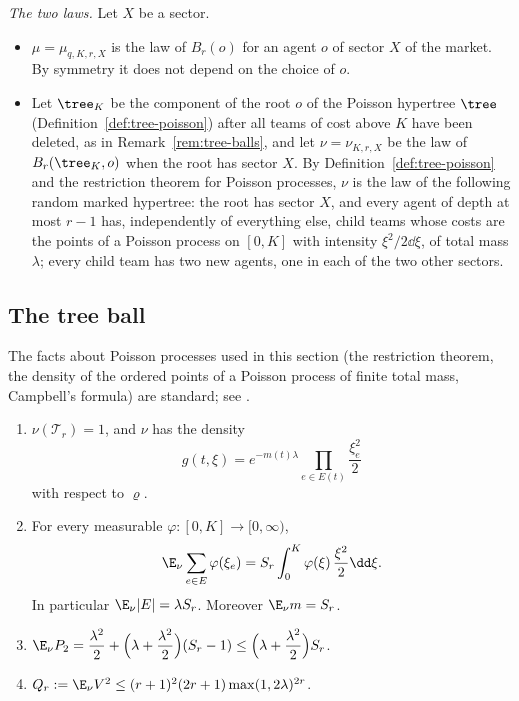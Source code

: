 \emph{The two laws.} Let $X$ be a sector.
\begin{itemize}
\item $\mu=\mu_{q,K,r,X}$ is the law of $B_r(o)$ for an agent $o$ of sector $X$ of the
market. By symmetry it does not depend on the choice of $o$.
\item Let $\tree_K$ be the component of the root $o$ of the Poisson hypertree $\tree$
(Definition~\ref{def:tree-poisson}) after all teams of cost above $K$ have been deleted, as
in Remark~\ref{rem:tree-balls}, and let $\nu=\nu_{K,r,X}$ be the law of $B_r(\tree_K,o)$
when the root has sector $X$. By Definition~\ref{def:tree-poisson} and the restriction
theorem for Poisson processes, $\nu$ is the law of the following random marked
hypertree: the root has sector $X$, and every agent of depth at most $r-1$ has, independently
of everything else, child teams whose costs are the points of a Poisson process on $[0,K]$
with intensity $\xi^2/2\dd\xi$, of total mass $\lambda$; every child team has two new
agents, one in each of the two other sectors.
\end{itemize}

\subsection{The tree ball}\label{sec:localconv-treeball}

The facts about Poisson processes used in this section (the restriction theorem, the
density of the ordered points of a Poisson process of finite total mass, Campbell's formula)
are standard; see \cite{LastPenrose17}.

\begin{lemma}\label{lem:localconv-tree}
\begin{enumerate}
\item[\textup{(i)}] $\nu(\mathcal T_r)=1$, and $\nu$ has the density
\begin{equation}\label{eq:localconv-treedensity}
g(t,\xi)=e^{-m(t)\lambda}\prod_{e\in E(t)}\frac{\xi_e^2}{2}
\end{equation}
with respect to $\varrho$.
\item[\textup{(ii)}] For every measurable $\varphi\colon[0,K]\to[0,\infty)$,
\[
\E_\nu\sum_{e\in E}\varphi(\xi_e)=S_r\int_0^K\varphi(\xi)\,\frac{\xi^2}{2}\dd\xi .
\]
In particular $\E_\nu|E|=\lambda S_r$. Moreover $\E_\nu m=S_r$.
\item[\textup{(iii)}] $\E_\nu P_2=\dfrac{\lambda^2}{2}+\Bigl(\lambda+\dfrac{\lambda^2}{2}\Bigr)
(S_r-1)\le\Bigl(\lambda+\dfrac{\lambda^2}{2}\Bigr)S_r$.
\item[\textup{(iv)}] $Q_r:=\E_\nu V^2\le(r+1)^2(2r+1)\max(1,2\lambda)^{2r}$.
\end{enumerate}
\end{lemma}

